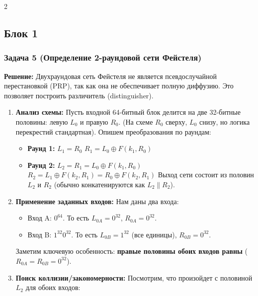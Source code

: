 ﻿\documentclass[10pt,a4paper,landscape]{extarticle}
\newcommand{\tightlist}{}
\begin{document}
\begin{multicols*}{2}

\subsection{Блок 1}\label{ux431ux43bux43eux43a-1}

\subsubsection{Задача 5 (Определение 2-раундовой сети Фейстеля)}\label{ux437ux430ux434ux430ux447ux430-5-ux43eux43fux440ux435ux434ux435ux43bux435ux43dux438ux435-2-ux440ux430ux443ux43dux434ux43eux432ux43eux439-ux441ux435ux442ux438-ux444ux435ux439ux441ux442ux435ux43bux44f}

\textbf{Решение:} Двухраундовая сеть Фейстеля не является псевдослучайной перестановкой (PRP), так как она не обеспечивает полную диффузию. Это позволяет построить различитель (distinguisher).

\begin{enumerate}
\def\labelenumi{\arabic{enumi}.}
\item
  \textbf{Анализ схемы:} Пусть входной 64-битный блок делится на две 32-битные половины: левую \(L_0\) и правую \(R_0\). (На схеме \(R_0\) сверху, \(L_0\) снизу, но логика перекрестий стандартная). Опишем преобразования по раундам:

  \begin{itemize}
  \tightlist
  \item
    \textbf{Раунд 1:} \(L_1 = R_0\) \(R_1 = L_0 \oplus F(k_1, R_0)\)
  \item
    \textbf{Раунд 2:} \(L_2 = R_1 = L_0 \oplus F(k_1, R_0)\) \(R_2 = L_1 \oplus F(k_2, R_1) = R_0 \oplus F(k_2, R_1)\) Выход сети состоит из половин \(L_2\) и \(R_2\) (обычно конкатенируются как \(L_2 \parallel R_2\)).
  \end{itemize}
\item
  \textbf{Применение заданных входов:} Нам даны два входа:

  \begin{itemize}
  \tightlist
  \item
    Вход A: \(0^{64}\). То есть \(L_{0A} = 0^{32}\), \(R_{0A} = 0^{32}\).
  \item
    Вход B: \(1^{32}0^{32}\). То есть \(L_{0B} = 1^{32}\) (все единицы), \(R_{0B} = 0^{32}\).
  \end{itemize}

  Заметим ключевую особенность: \textbf{правые половины обоих входов равны} (\(R_{0A} = R_{0B} = 0^{32}\)).
\item
  \textbf{Поиск коллизии/закономерности:} Посмотрим, что произойдет с половиной \(L_2\) для обоих входов:


\end{enumerate}
\end{multicols*}
\end{document}
